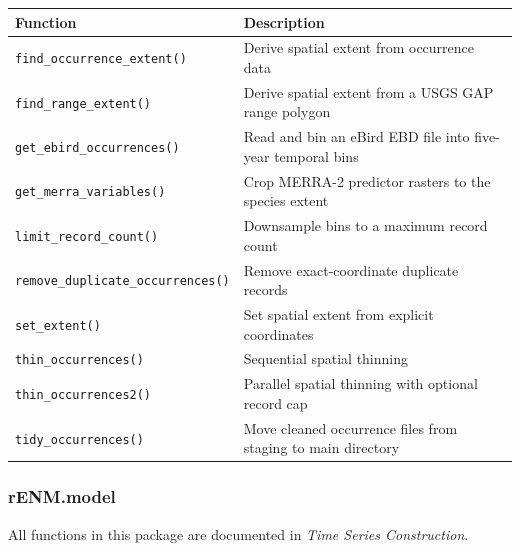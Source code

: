 \documentclass[
  letterpaper,
  DIV=11,
  numbers=noendperiod]{scrartcl}
\newcounter{none} %
\begin{document}
{\def\LTcaptype{none} %
\begin{longtable}[]{@{}
  >{\raggedright\arraybackslash}p{}
  >{\raggedright\arraybackslash}p{}@{}}
\toprule\noalign{}
\begin{minipage}[b]{\linewidth}\raggedright
Function
\end{minipage} & \begin{minipage}[b]{\linewidth}\raggedright
Description
\end{minipage} \\
\midrule\noalign{}
\endhead
\bottomrule\noalign{}
\endlastfoot
\texttt{find\_occurrence\_extent()} & Derive spatial extent from
occurrence data \\
\texttt{find\_range\_extent()} & Derive spatial extent from a USGS GAP
range polygon \\
\texttt{get\_ebird\_occurrences()} & Read and bin an eBird EBD file into
five-year temporal bins \\
\texttt{get\_merra\_variables()} & Crop MERRA-2 predictor rasters to the
species extent \\
\texttt{limit\_record\_count()} & Downsample bins to a maximum record
count \\
\texttt{remove\_duplicate\_occurrences()} & Remove exact-coordinate
duplicate records \\
\texttt{set\_extent()} & Set spatial extent from explicit coordinates \\
\texttt{thin\_occurrences()} & Sequential spatial thinning \\
\texttt{thin\_occurrences2()} & Parallel spatial thinning with optional
record cap \\
\texttt{tidy\_occurrences()} & Move cleaned occurrence files from
staging to main directory \\
\end{longtable}
}

\subsubsection{rENM.model}\label{renm.model}

All functions in this package are documented in \emph{Time Series
Construction}.
\end{document}
